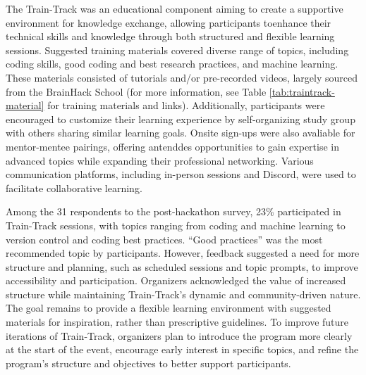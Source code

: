 \documentclass{article}
\begin{document}
The Train-Track was an educational component aiming to create a supportive environment for knowledge exchange, allowing participants toenhance their technical skills and knowledge through both structured and flexible learning sessions. Suggested training materials covered diverse range of topics, including coding skills, good coding and best research practices, and machine learning. These materials consisted of tutorials and/or pre-recorded videos, largely sourced from the BrainHack School (for more information, see Table \ref{tab:traintrack-material} for training materials and links). Additionally, participants were encouraged to customize their learning experience  by self-organizing  study group with others sharing similar learning goals. Onsite sign-ups were also avaliable for mentor-mentee pairings, offering antenddes opportunities to gain expertise in advanced topics while expanding their professional networking. Various communication platforms, including in-person sessions and Discord, were used to facilitate collaborative learning.

Among the 31 respondents to the post-hackathon survey, 23\% participated in Train-Track sessions, with topics ranging from coding and machine learning to version control and coding best practices. “Good practices” was the most recommended topic by participants. However, feedback suggested a need for more structure and planning, such as scheduled sessions and topic prompts, to improve accessibility and participation. Organizers acknowledged the value of increased structure while maintaining Train-Track’s dynamic and community-driven nature. The goal remains to provide a flexible learning environment with suggested materials for inspiration, rather than prescriptive guidelines. To improve future iterations of Train-Track, organizers plan to introduce the program more clearly at the start of the event, encourage early interest in specific topics, and refine the program’s structure and objectives to better support participants.
\end{document}
